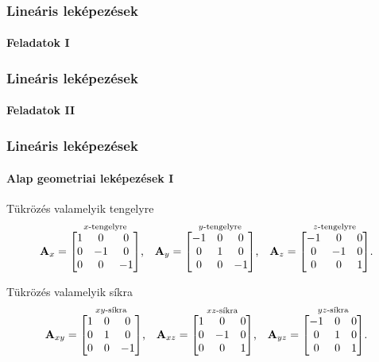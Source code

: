 \begin{frame}
  \frametitle{Lineáris leképezések}
  \framesubtitle{Feladatok I}

  
\end{frame}

\begin{frame}
  \frametitle{Lineáris leképezések}
  \framesubtitle{Feladatok II}

  
\end{frame}

\begin{frame}
  \frametitle{Lineáris leképezések}
  \framesubtitle{Alap geometriai leképezések I}

  \begin{block}{Tükrözés valamelyik tengelyre}
    \[
      \mathbf{A}_x = \overset{x\text{-tengelyre}}{\begin{bmatrix}
          1 & 0  & 0  \\
          0 & -1 & 0  \\
          0 & 0  & -1
        \end{bmatrix}}
      \text,
      \quad
      \mathbf{A}_y = \overset{y\text{-tengelyre}}{\begin{bmatrix}
          -1 & 0 & 0  \\
          0  & 1 & 0  \\
          0  & 0 & -1
        \end{bmatrix}}
      \text,
      \quad
      \mathbf{A}_z = \overset{z\text{-tengelyre}}{\begin{bmatrix}
          -1 & 0  & 0 \\
          0  & -1 & 0 \\
          0  & 0  & 1
        \end{bmatrix}}
      \text.
    \]
  \end{block}

  \begin{block}{Tükrözés valamelyik síkra}
    \[
      \mathbf{A}_{xy} = \overset{xy\text{-síkra}}{\begin{bmatrix}
          1 & 0 & 0  \\
          0 & 1 & 0  \\
          0 & 0 & -1
        \end{bmatrix}}
      \text,
      \quad
      \mathbf{A}_{xz} = \overset{xz\text{-síkra}}{\begin{bmatrix}
          1 & 0  & 0 \\
          0 & -1 & 0 \\
          0 & 0  & 1
        \end{bmatrix}}
      \text,
      \quad
      \mathbf{A}_{yz} = \overset{yz\text{-síkra}}{\begin{bmatrix}
          -1 & 0 & 0 \\
          0  & 1 & 0 \\
          0  & 0 & 1
        \end{bmatrix}}
      \text.
    \]
  \end{block}
\end{frame}

